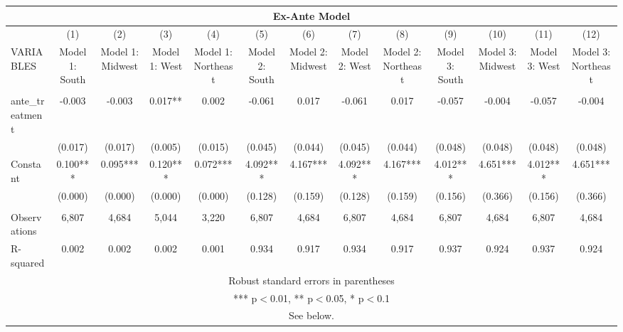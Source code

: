 \begin{tabular}{lcccccccccccc}
\multicolumn{13}{c}{Ex-Ante Model} \\ \hline
 & (1) & (2) & (3) & (4) & (5) & (6) & (7) & (8) & (9) & (10) & (11) & (12) \\
VARIABLES & Model 1: South & Model 1: Midwest & Model 1: West & Model 1: Northeast & Model 2: South & Model 2: Midwest & Model 2: West & Model 2: Northeast & Model 3: South & Model 3: Midwest & Model 3: West & Model 3: Northeast \\ \hline
 &  &  &  &  &  &  &  &  &  &  &  &  \\
ante\_treatment & -0.003 & -0.003 & 0.017** & 0.002 & -0.061 & 0.017 & -0.061 & 0.017 & -0.057 & -0.004 & -0.057 & -0.004 \\
 & (0.017) & (0.017) & (0.005) & (0.015) & (0.045) & (0.044) & (0.045) & (0.044) & (0.048) & (0.048) & (0.048) & (0.048) \\
Constant & 0.100*** & 0.095*** & 0.120*** & 0.072*** & 4.092*** & 4.167*** & 4.092*** & 4.167*** & 4.012*** & 4.651*** & 4.012*** & 4.651*** \\
 & (0.000) & (0.000) & (0.000) & (0.000) & (0.128) & (0.159) & (0.128) & (0.159) & (0.156) & (0.366) & (0.156) & (0.366) \\
 &  &  &  &  &  &  &  &  &  &  &  &  \\
Observations & 6,807 & 4,684 & 5,044 & 3,220 & 6,807 & 4,684 & 6,807 & 4,684 & 6,807 & 4,684 & 6,807 & 4,684 \\
 R-squared & 0.002 & 0.002 & 0.002 & 0.001 & 0.934 & 0.917 & 0.934 & 0.917 & 0.937 & 0.924 & 0.937 & 0.924 \\ \hline
\multicolumn{13}{c}{ Robust standard errors in parentheses} \\
\multicolumn{13}{c}{ *** p$<$0.01, ** p$<$0.05, * p$<$0.1} \\
\multicolumn{13}{c}{ See below.} \\
\end{tabular}

